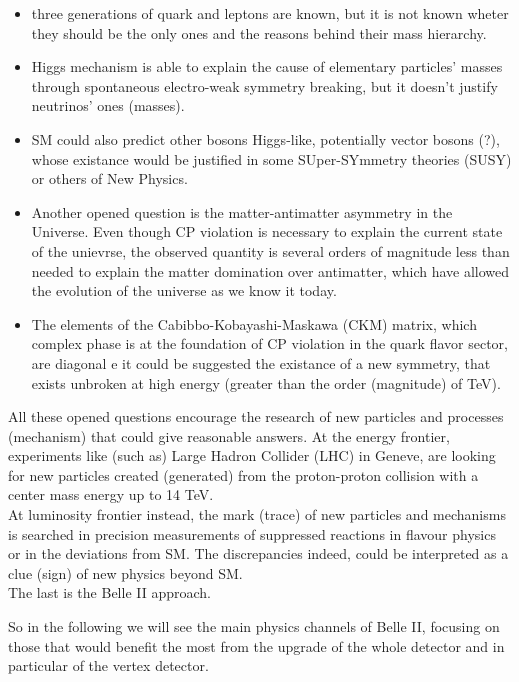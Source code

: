 \begin{itemize}
\item three generations of quark and leptons are known, but it is not known wheter they should be the only ones and the reasons behind their mass hierarchy.
\item Higgs mechanism is able to explain the cause of elementary particles' masses through spontaneous electro-weak symmetry breaking, but it doesn't justify neutrinos' ones (masses).
\item SM could also predict other bosons Higgs-like, potentially vector bosons (?), whose existance would be justified in some SUper-SYmmetry theories (SUSY) or others of New Physics.
\item Another opened question is the matter-antimatter asymmetry in the Universe. Even though CP violation is necessary to explain the current state of the unievrse, the observed quantity is several orders of magnitude less than needed to explain the matter domination over antimatter, which have allowed the evolution of the universe as we know it today.
\item The elements of the Cabibbo-Kobayashi-Maskawa (CKM) matrix, which complex phase is at the foundation of CP violation in the quark flavor sector, are diagonal e it could be suggested the existance of a new symmetry, that exists unbroken at high energy (greater than the order (magnitude) of TeV).
\end{itemize}

All these opened questions encourage the research of new particles and processes (mechanism) that could give reasonable answers.
At the energy frontier, experiments like (such as) Large Hadron Collider (LHC) in Geneve, are looking for new particles created (generated) from the proton-proton collision with a center mass energy up to 14 TeV.\\
At luminosity frontier instead, the mark (trace) of new particles and mechanisms is searched in precision measurements of suppressed reactions in flavour physics or in the deviations from SM. The discrepancies indeed, could be interpreted as a clue (sign) of new physics beyond SM. \\
The last is the Belle II approach.

So in the following we will see the main physics channels of Belle II, focusing on those that would benefit the most from the upgrade of the whole detector and in particular of the vertex detector.


